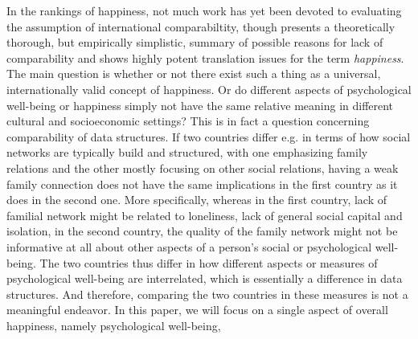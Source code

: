 \documentclass[titlepage,11pt,twoside]{article}
\begin{document}
In the rankings of happiness, not much work has yet been devoted to evaluating the assumption of international comparabiltity, though \cite{Veenhoven2012} presents a theoretically thorough, but empirically simplistic, summary of possible reasons for lack of comparability and \cite{Lolle2016} shows highly potent translation issues for the term \textit{happiness}. The main question is whether or not there exist such a thing as a universal, internationally valid concept of happiness. Or do different aspects of psychological well-being or happiness simply not have the same relative meaning in different cultural and socioeconomic settings? This is in fact a question concerning comparability of data structures. If two countries differ e.g. in terms of how social networks are typically build and structured, with one emphasizing family relations and the other mostly focusing on other social relations, having a weak family connection does not have the same implications in the first country as it does in the second one. More specifically, whereas in the first country, lack of familial network might be related to loneliness, lack of general social capital and isolation, in the second country, the quality of the family network might not be informative at all about other aspects of a person's social or psychological well-being. The two countries thus differ in how different aspects or measures of psychological well-being are interrelated, which is essentially a difference in data structures. And therefore, comparing the two countries in these measures is not a meaningful endeavor. In this paper, we will focus on a single aspect of overall happiness, namely psychological well-being,
\end{document}

